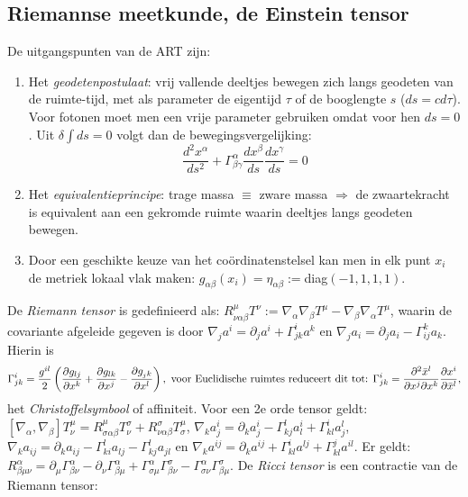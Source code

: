 \documentclass[twoside]{report}
\begin{document}
\subsection{Riemannse meetkunde, de Einstein tensor}
De uitgangspunten van de ART zijn:
\begin{enumerate}
\item Het {\it geodetenpostulaat}: vrij vallende deeltjes bewegen zich langs
      geodeten van de ruimte-tijd, met als parameter de eigentijd $\tau$ of
      de booglengte $s$ ($ds=cd\tau$). Voor fotonen moet men een vrije
      parameter gebruiken omdat voor hen $ds=0$. Uit $\delta\int ds=0$ volgt
      dan de bewegingsvergelijking:
      \[
      \frac{d^2x^\alpha}{ds^2}+\Gamma_{\beta\gamma}^{\alpha}\frac{dx^\beta}{ds}\frac{dx^\gamma}{ds}=0
      \]
\item Het {\it equivalentieprincipe}: trage massa $\equiv$ zware massa
      $\Rightarrow$ de zwaartekracht is equivalent aan een gekromde ruimte
      waarin deeltjes langs geodeten bewegen.
\item Door een geschikte keuze van het co\"ordinatenstelsel kan men in elk
      punt $x_i$ de metriek lokaal vlak maken:
      $g_{\alpha\beta}(x_i)=\eta_{\alpha\beta}:=$diag$(-1,1,1,1)$.
\end{enumerate}
\npar
De {\it Riemann tensor} is gedefinieerd als:
$R^\mu_{\nu\alpha\beta}T^\nu:=\nabla_\alpha\nabla_\beta T^\mu-\nabla_\beta\nabla_\alpha T^\mu$,
waarin de covariante afgeleide gegeven is door
$\nabla_j a^i=\partial_ja^i+\Gamma_{jk}^ia^k$ en
$\nabla_j a_i=\partial_ja_i-\Gamma_{ij}^ka_k$. Hierin is
\[
\Gamma_{jk}^i=\frac{g^{il}}{2}\left(\frac{\partial g_{lj}}{\partial x^k}+
\frac{\partial g_{lk}}{\partial x^j}-\frac{\partial g_{_jk}}{\partial x^l}\right),
\mbox{ voor Euclidische ruimtes reduceert dit tot: }
\Gamma_{jk}^i=\frac{\partial^2\bar{x}^l}{\partial x^j\partial x^k}\frac{\partial x^i}{\partial \bar{x}^l},
\]
het {\it Christoffelsymbool} of affiniteit. Voor een 2e orde tensor geldt:
$[\nabla_\alpha,\nabla_\beta]T_\nu^\mu=R_{\sigma\alpha\beta}^\mu T^\sigma_\nu+R^\sigma_{\nu\alpha\beta}T^\mu_\sigma$,
$\nabla_k a^i_j=\partial_ka^i_j-\Gamma_{kj}^la_l^i+\Gamma_{kl}^ia_j^l$,
$\nabla_k a_{ij}=\partial_ka_{ij}-\Gamma_{ki}^la_{lj}-\Gamma_{kj}^la_{jl}$ en
$\nabla_k a^{ij}=\partial_ka^{ij}+\Gamma_{kl}^ia^{lj}+\Gamma_{kl}^ja^{il}$.
Er geldt: $R_{\beta\mu\nu}^\alpha=\partial_\mu\Gamma_{\beta\nu}^\alpha-\partial_\nu\Gamma_{\beta\mu}^\alpha+
\Gamma_{\sigma\mu}^\alpha\Gamma_{\beta\nu}^\sigma-\Gamma_{\sigma\nu}^\alpha\Gamma_{\beta\mu}^\sigma$.
\npar
De {\it Ricci tensor} is een contractie van de Riemann tensor:
\end{document}
